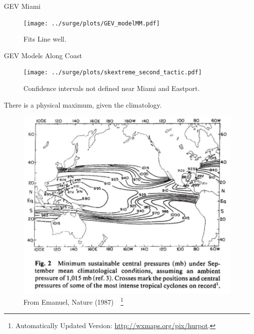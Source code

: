\begin{frame}{GEV Miami}
\vspace{-20pt}
 \begin{minipage}{1.0\textwidth}
\begin{figure}[htb!]
    \centering
    \texttt{[image: ../surge/plots/GEV\_modelMM.pdf]}
    \vspace{-25pt}
   \caption{Fits Line well.}
\end{figure}
\end{minipage}
\end{frame}

\begin{frame}{GEV Models Along Coast}
\vspace{-20pt}
 \begin{minipage}{1.0\textwidth}
\begin{figure}[htb!]
    \centering
    \texttt{[image: ../surge/plots/skextreme\_second\_tactic.pdf]}
    \vspace{-15pt}
   \caption{Confidence intervals not defined near Miami and Eastport. }
\end{figure}
\end{minipage}
\end{frame}


\begin{frame}{There is a physical maximum, given the climatology.}

\vspace{-30pt}
\begin{figure}[htb!]
    \centering
    \includegraphics[width=0.8\linewidth]{images/hurricane-Emanuel-upper-bound.png}
    \vspace{-15pt}
   \caption{From Emanuel, Nature (1987)~\cite{emanuel1987dependence}~\footnote{Automatically Updated Version: \url{http://wxmaps.org/pix/hurpot}.} }
    \label{fig:}
\end{figure}
\end{frame}

